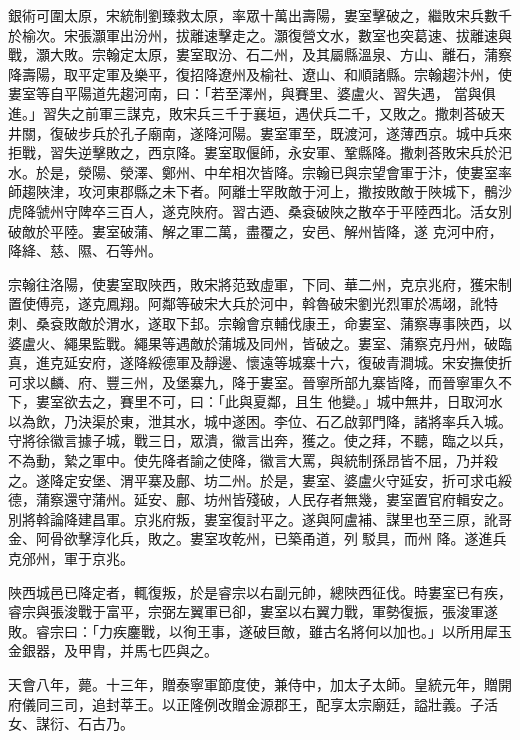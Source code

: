 \begin{pinyinscope}
 銀術可圍太原，宋統制劉臻救太原，率眾十萬出壽陽，婁室擊破之，繼敗宋兵數千於榆次。宋張灝軍出汾州，拔離速擊走之。灝復營文水，數室也突葛速、拔離速與戰，灝大敗。宗翰定太原，婁室取汾、石二州，及其屬縣溫泉、方山、離石，蒲察降壽陽，取平定軍及樂平，復招降遼州及榆社、遼山、和順諸縣。宗翰趨汴州，使婁室等自平陽道先趨河南，曰：「若至澤州，與賽里、婆盧火、習失遇，
 當與俱進。」習失之前軍三謀克，敗宋兵三千于襄垣，遇伏兵二千，又敗之。撒刺荅破天井關，復破步兵於孔子廟南，遂降河陽。婁室軍至，既渡河，遂薄西京。城中兵來拒戰，習失逆擊敗之，西京降。婁室取偃師，永安軍、鞏縣降。撒刺荅敗宋兵於汜水。於是，滎陽、滎澤、鄭州、中牟相次皆降。宗翰已與宗望會軍于汴，使婁室率師趨陜津，攻河東郡縣之未下者。阿離士罕敗敵于河上，撒按敗敵于陜城下，鶻沙虎降虢州守陴卒三百人，遂克陜府。習古迺、桑袞破陜之散卒于平陸西北。活女別破敵於平陸。婁室破蒲、解之軍二萬，盡覆之，安邑、解州皆降，遂
 克河中府，降絳、慈、隰、石等州。



 宗翰往洛陽，使婁室取陜西，敗宋將范致虛軍，下同、華二州，克京兆府，獲宋制置使傅亮，遂克鳳翔。阿鄰等破宋大兵於河中，斡魯破宋劉光烈軍於馮翊，訛特刺、桑袞敗敵於渭水，遂取下邽。宗翰會京輔伐康王，命婁室、蒲察專事陜西，以婆盧火、繩果監戰。繩果等遇敵於蒲城及同州，皆破之。婁室、蒲察克丹州，破臨真，進克延安府，遂降綏德軍及靜邊、懷遠等城寨十六，復破青澗城。宋安撫使折可求以麟、府、豐三州，及堡寨九，降于婁室。晉寧所部九寨皆降，而晉寧軍久不下，婁室欲去之，賽里不可，曰：「此與夏鄰，且生
 他變。」城中無井，日取河水以為飲，乃決渠於東，泄其水，城中遂困。李位、石乙啟郭門降，諸將率兵入城。守將徐徽言據子城，戰三日，眾潰，徽言出奔，獲之。使之拜，不聽，臨之以兵，不為動，縶之軍中。使先降者諭之使降，徽言大罵，與統制孫昂皆不屈，乃并殺之。遂降定安堡、渭平寨及鄜、坊二州。於是，婁室、婆盧火守延安，折可求屯綏德，蒲察還守蒲州。延安、鄜、坊州皆殘破，人民存者無幾，婁室置官府輯安之。別將斡論降建昌軍。京兆府叛，婁室復討平之。遂與阿盧補、謀里也至三原，訛哥金、阿骨欲擊淳化兵，敗之。婁室攻乾州，已築甬道，列駁具，而州
 降。遂進兵克邠州，軍于京兆。



 陜西城邑已降定者，輒復叛，於是睿宗以右副元帥，總陜西征伐。時婁室已有疾，睿宗與張浚戰于富平，宗弼左翼軍已卻，婁室以右翼力戰，軍勢復振，張浚軍遂敗。睿宗曰：「力疾鏖戰，以徇王事，遂破巨敵，雖古名將何以加也。」以所用犀玉金銀器，及甲胄，并馬七匹與之。



 天會八年，薨。十三年，贈泰寧軍節度使，兼侍中，加太子太師。皇統元年，贈開府儀同三司，追封莘王。以正隆例改贈金源郡王，配享太宗廟廷，謚壯義。子活女、謀衍、石古乃。




\end{pinyinscope}
